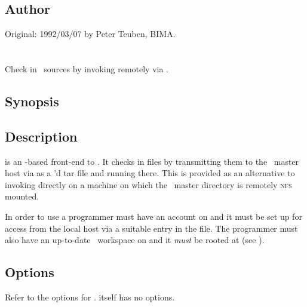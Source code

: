 \subsection*{Author}

Original: 1992/03/07 by Peter Teuben, BIMA.
 
 
\newpage
\section{}
\label{rai}
 
Check in \aipspp\ sources by invoking  remotely via .

\subsection*{Synopsis}
 
\begin{synopsis}
\end{synopsis}
 
\subsection*{Description}
 
 is an -based front-end to .  It checks in
files by transmitting them to the \aipspp\ master host via  as a
'd tar file and running  there.  This is provided as
an alternative to invoking  directly on a machine on which the
\aipspp\ master directory is remotely \textsc{nfs} mounted.

In order to use  a programmer must have an account on
 and it must be set up for  access from the
local host via a suitable entry in the  file.  The programmer
must also have an up-to-date \aipspp\ workspace on  and
it \emph{must} be  rooted at  (see ).

\subsection*{Options}
 
Refer to the options for .   itself has no options.

